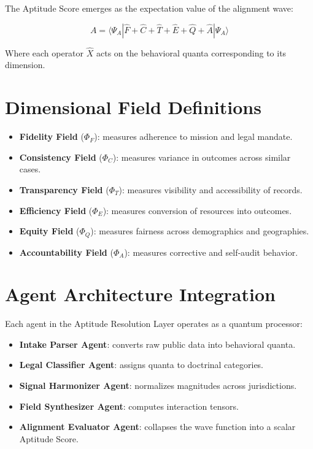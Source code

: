 \documentclass[a4paper,11pt]{article}
\begin{document}
	The Aptitude Score emerges as the expectation value of the alignment wave:
	
	
	
	\[
	A = \langle \Psi_A | \hat{F} + \hat{C} + \hat{T} + \hat{E} + \hat{Q} + \hat{A} | \Psi_A \rangle
	\]
	
	
	
	Where each operator \(\hat{X}\) acts on the behavioral quanta corresponding to its dimension.
	
	\section{Dimensional Field Definitions}
	
	\begin{itemize}
		\item \textbf{Fidelity Field} (\(\Phi_F\)): measures adherence to mission and legal mandate.
		\item \textbf{Consistency Field} (\(\Phi_C\)): measures variance in outcomes across similar cases.
		\item \textbf{Transparency Field} (\(\Phi_T\)): measures visibility and accessibility of records.
		\item \textbf{Efficiency Field} (\(\Phi_E\)): measures conversion of resources into outcomes.
		\item \textbf{Equity Field} (\(\Phi_Q\)): measures fairness across demographics and geographies.
		\item \textbf{Accountability Field} (\(\Phi_A\)): measures corrective and self‑audit behavior.
	\end{itemize}
	
	\section{Agent Architecture Integration}
	
	Each agent in the Aptitude Resolution Layer operates as a quantum processor:
	
	\begin{itemize}
		\item \textbf{Intake Parser Agent}: converts raw public data into behavioral quanta.
		\item \textbf{Legal Classifier Agent}: assigns quanta to doctrinal categories.
		\item \textbf{Signal Harmonizer Agent}: normalizes magnitudes across jurisdictions.
		\item \textbf{Field Synthesizer Agent}: computes interaction tensors.
		\item \textbf{Alignment Evaluator Agent}: collapses the wave function into a scalar Aptitude Score.
	\end{itemize}
	
\end{document}
